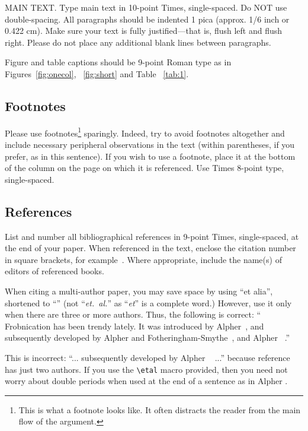\documentclass[10pt,twocolumn,letterpaper]{article}
\begin{document}
MAIN TEXT. Type main text in 10-point Times, single-spaced. Do NOT use
double-spacing. All paragraphs should be indented 1 pica (approx. 1/6
inch or 0.422 cm). Make sure your text is fully justified---that is,
flush left and flush right. Please do not place any additional blank
lines between paragraphs.

Figure and table captions should be 9-point Roman type as in
Figures~\ref{fig:onecol}, ~\ref{fig:short} and Table ~\ref{tab:1}.


\subsection{Footnotes}

Please use footnotes\footnote {This is what a footnote looks like.  It
often distracts the reader from the main flow of the argument.} sparingly.
Indeed, try to avoid footnotes altogether and include necessary peripheral
observations in the text (within parentheses, if you prefer, as in this sentence).
If you wish to use a footnote, place it at the bottom of the column on the 
page on which it is referenced. Use Times 8-point type, single-spaced.


\subsection{References}
List and number all bibliographical references in 9-point Times,
single-spaced, at the end of your paper. When referenced in the text,
enclose the citation number in square brackets, for
example~\cite{Authors14}.  Where appropriate, include the name(s) of
editors of referenced books.

When citing a multi-author paper, you may save space by using ``et alia'',
shortened to ``\etal'' (not ``{\em et.\ al.}'' as ``{\em et}'' is a complete word.)
However, use it only when there are three or more authors.  Thus, the
following is correct: ``
Frobnication has been trendy lately.
It was introduced by Alpher~\cite{Alpher02}, and subsequently developed by
Alpher and Fotheringham-Smythe~\cite{Alpher03}, and Alpher \etal~\cite{Alpher04}.''

This is incorrect: ``... subsequently developed by Alpher \etal~\cite{Alpher03} ...''
because reference~\cite{Alpher03} has just two authors.  If you use the
\verb'\etal' macro provided, then you need not worry about double periods
when used at the end of a sentence as in Alpher \etal.





{\small


}
\end{document}
